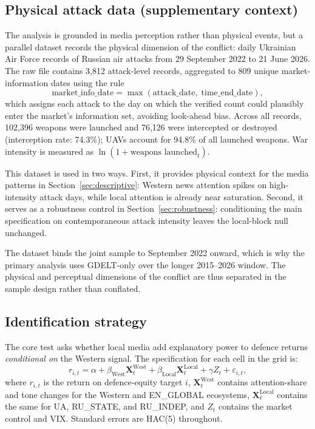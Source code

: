 \documentclass[12pt,a4paper]{article}
\begin{document}
\subsection{Physical attack data (supplementary context)}
\label{sec:attacks}

The analysis is grounded in media perception rather than physical events, but a parallel dataset records the physical dimension of the conflict: daily Ukrainian Air Force records of Russian air attacks from 29 September 2022 to 21 June 2026. The raw file contains 3,812 attack-level records, aggregated to 809 unique market-information dates using the rule
\begin{equation}
\text{market\_info\_date} = \max(\text{attack\_date},\; \text{time\_end\_date}),
\end{equation}
which assigns each attack to the day on which the verified count could plausibly enter the market's information set, avoiding look-ahead bias. Across all records, 102,396 weapons were launched and 76,126 were intercepted or destroyed (interception rate: 74.3\%); UAVs account for 94.8\% of all launched weapons. War intensity is measured as $\ln(1 + \text{weapons launched}_t)$.

This dataset is used in two ways. First, it provides physical context for the media patterns in Section~\ref{sec:descriptive}: Western news attention spikes on high-intensity attack days, while local attention is already near saturation. Second, it serves as a robustness control in Section~\ref{sec:robustness}: conditioning the main specification on contemporaneous attack intensity leaves the local-block null unchanged.

The dataset binds the joint sample to September 2022 onward, which is why the primary analysis uses GDELT-only over the longer 2015--2026 window. The physical and perceptual dimensions of the conflict are thus separated in the sample design rather than conflated.

\subsection{Identification strategy}
\label{sec:identification}

The core test asks whether local media add explanatory power to defence returns \textit{conditional on} the Western signal. The specification for each cell in the grid is:
\begin{equation}
r_{i,t} = \alpha + \beta_{\mathrm{West}} \mathbf{X}^{\mathrm{West}}_t + \beta_{\mathrm{Local}} \mathbf{X}^{\mathrm{Local}}_t + \gamma Z_t + \varepsilon_{i,t},
\label{eq:main}
\end{equation}
where $r_{i,t}$ is the return on defence-equity target $i$, $\mathbf{X}^{\mathrm{West}}_t$ contains attention-share and tone changes for the Western and EN\_GLOBAL ecosystems, $\mathbf{X}^{\mathrm{Local}}_t$ contains the same for UA, RU\_STATE, and RU\_INDEP, and $Z_t$ contains the market control and VIX. Standard errors are HAC(5) throughout.
\end{document}
